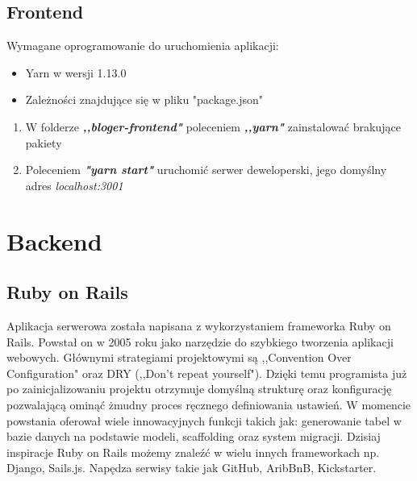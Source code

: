 \documentclass[declaration,shortabstract]{iithesis}
\begin{document}
\subsection{Frontend}
Wymagane oprogramowanie do uruchomienia aplikacji:
    \begin{itemize}
        \item Yarn w wersji 1.13.0
        \item Zależności znajdujące się w pliku "package.json" 
    \end{itemize}

\begin{enumerate}
    \item W folderze \textbf{\textit{,,bloger-frontend"}} poleceniem \textbf{\textit{,,yarn"}} zainstalować brakujące pakiety
    \item Poleceniem \textbf{\textit{"yarn start"}} uruchomić serwer deweloperski, jego domyślny adres \textit{localhost:3001}
\end{enumerate}

\section{Backend}
\subsection{Ruby on Rails}
Aplikacja serwerowa została napisana z wykorzystaniem frameworka Ruby on Rails. Powstał on w 2005 roku jako narzędzie do szybkiego tworzenia aplikacji webowych. Głównymi strategiami projektowymi są ,,Convention Over Configuration" oraz DRY (,,Don't repeat yourself"). Dzięki temu programista już po zainicjalizowaniu projektu otrzymuje domyślną strukturę oraz konfigurację pozwalającą ominąć żmudny proces ręcznego definiowania ustawień. W momencie powstania oferował wiele innowacyjnych funkcji takich jak: generowanie tabel w bazie danych na podstawie modeli, scaffolding oraz system migracji. Dzisiaj inspiracje Ruby on Rails możemy znaleźć w wielu innych frameworkach np. Django, Sails.js. Napędza serwisy takie jak GitHub, AribBnB, Kickstarter.
\end{document}
